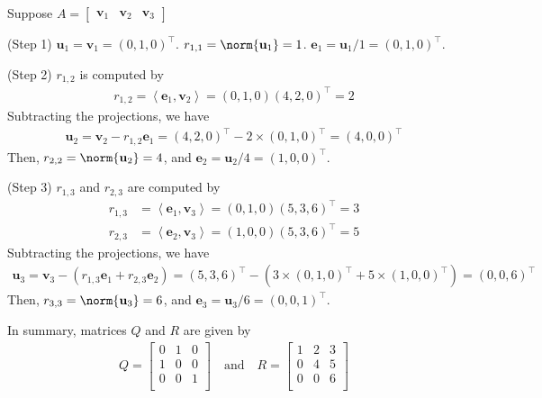 \documentclass[thmcnt=section, color=blue, 12pt]{my-elegantbook}
\begin{document}
\begin{solution}
    Suppose $A = \begin{bmatrix}
        \mathbf{v}_1 & \mathbf{v}_2 & \mathbf{v}_3
    \end{bmatrix}$

    (Step 1) $\mathbf{u}_1 = \mathbf{v}_1 = (0,1,0)^\top$. $r_{1,1} = \norm{\mathbf{u}_1} = 1$. $\mathbf{e}_1 = \mathbf{u}_1 / 1 = (0,1,0)^\top$.

    (Step 2) $r_{1,2}$ is computed by
    \begin{align*}
        r_{1,2} 
        = \left\langle \mathbf{e}_1, \mathbf{v}_2 \right\rangle 
        = (0,1,0) (4,2,0)^\top 
        = 2
    \end{align*}
    Subtracting the projections, we have
    \begin{align*}
        \mathbf{u}_2 = \mathbf{v}_2 - r_{1,2} \mathbf{e}_1
        = (4,2,0)^\top - 2 \times (0,1,0)^\top
        = (4,0,0)^\top
    \end{align*}
    Then, $r_{2,2} = \norm{\mathbf{u}_2} = 4$, and $\mathbf{e}_2 = \mathbf{u}_2 / 4 = (1,0,0)^\top$.

    (Step 3) $r_{1,3}$ and $r_{2,3}$ are computed by
    \begin{align*}
        r_{1,3} 
        &= \left\langle \mathbf{e}_1, \mathbf{v}_3 \right\rangle 
        = (0,1,0) (5,3,6)^\top 
        = 3 \\ 
        r_{2,3} 
        &= \left\langle \mathbf{e}_2, \mathbf{v}_3 \right\rangle 
        = (1,0,0) (5,3,6)^\top 
        = 5
    \end{align*}
    Subtracting the projections, we have
    \begin{align*}
        \mathbf{u}_3 = \mathbf{v}_3 - (r_{1,3} \mathbf{e}_1 + r_{2,3} \mathbf{e}_2)
        = (5,3,6)^\top - (3 \times (0,1,0)^\top + 5 \times (1,0,0)^\top)
        = (0,0,6)^\top
    \end{align*}
    Then, $r_{3,3} = \norm{\mathbf{u}_3} = 6$, and $\mathbf{e}_3 = \mathbf{u}_3 / 6 = (0,0,1)^\top$.

    In summary, matrices $Q$ and $R$ are given by 
    \begin{align*}
        Q = \begin{bmatrix}
            0 & 1 & 0 \\ 
            1 & 0 & 0 \\ 
            0 & 0 & 1 \\ 
        \end{bmatrix}
        \quad \text{and} \quad
        R = \begin{bmatrix}
            1 & 2 & 3 \\ 
            0 & 4 & 5 \\ 
            0 & 0 & 6 \\ 
        \end{bmatrix}
    \end{align*}
\end{solution}
\end{document}

